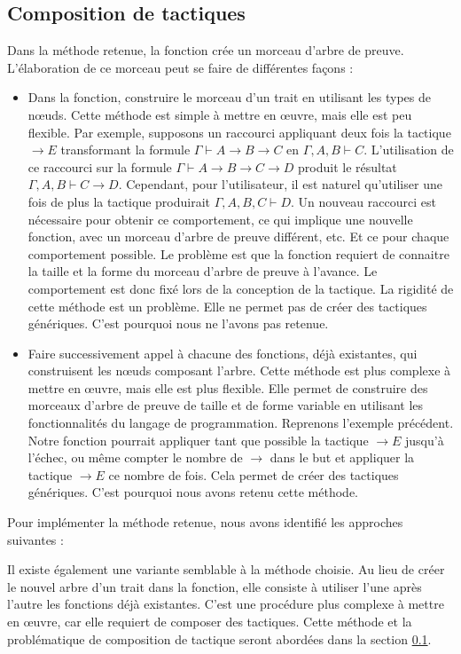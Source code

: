 \documentclass[titlepage,draft]{article}
\begin{document}
\subsection{Composition de tactiques} \label{CompositionTactiques}
Dans la méthode retenue, la fonction crée un morceau d'arbre de preuve. L'élaboration de ce morceau peut se faire de différentes façons :
\begin{itemize}
    \item Dans la fonction, construire le morceau d'un trait en utilisant les types de nœuds. Cette méthode est simple à mettre en œuvre, mais elle est peu flexible. Par exemple, supposons un raccourci appliquant deux fois la tactique $\to E$ transformant la formule $\Gamma \vdash A \to B \to C$ en $\Gamma, A, B \vdash C$. L'utilisation de ce raccourci sur la formule $\Gamma \vdash A \to B \to C \to D$ produit le résultat $\Gamma, A, B \vdash C \to D$. Cependant, pour l'utilisateur, il est naturel qu'utiliser une fois de plus la tactique produirait $\Gamma, A, B, C \vdash D$. Un nouveau raccourci est nécessaire pour obtenir ce comportement, ce qui implique une nouvelle fonction, avec un morceau d'arbre de preuve différent, etc. Et ce pour chaque comportement possible. Le problème est que la fonction requiert de connaitre la taille et la forme du morceau d'arbre de preuve à l'avance. Le comportement est donc fixé lors de la conception de la tactique. La rigidité de cette méthode est un problème. Elle ne permet pas de créer des tactiques génériques. C'est pourquoi nous ne l'avons pas retenue.
    \item Faire successivement appel à chacune des fonctions, déjà existantes, qui construisent les nœuds composant l'arbre. Cette méthode est plus complexe à mettre en œuvre, mais elle est plus flexible. Elle permet de construire des morceaux d'arbre de preuve de taille et de forme variable en utilisant les fonctionnalités du langage de programmation. Reprenons l'exemple précédent. Notre fonction pourrait appliquer tant que possible la tactique $\to E$ jusqu'à l'échec, ou même compter le nombre de $\to$ dans le but et appliquer la tactique $\to E$ ce nombre de fois. Cela permet de créer des tactiques génériques. C'est pourquoi nous avons retenu cette méthode.
\end{itemize}

Pour implémenter la méthode retenue, nous avons identifié les approches suivantes :



Il existe également une variante semblable à la méthode choisie. Au lieu de créer le nouvel arbre d'un trait dans la fonction, elle consiste à utiliser l'une après l'autre les fonctions déjà existantes. C'est une procédure plus complexe à mettre en œuvre, car elle requiert de composer des tactiques. Cette méthode et la problématique de composition de tactique seront abordées dans la section \ref{CompositionTactiques}.
\end{document}
